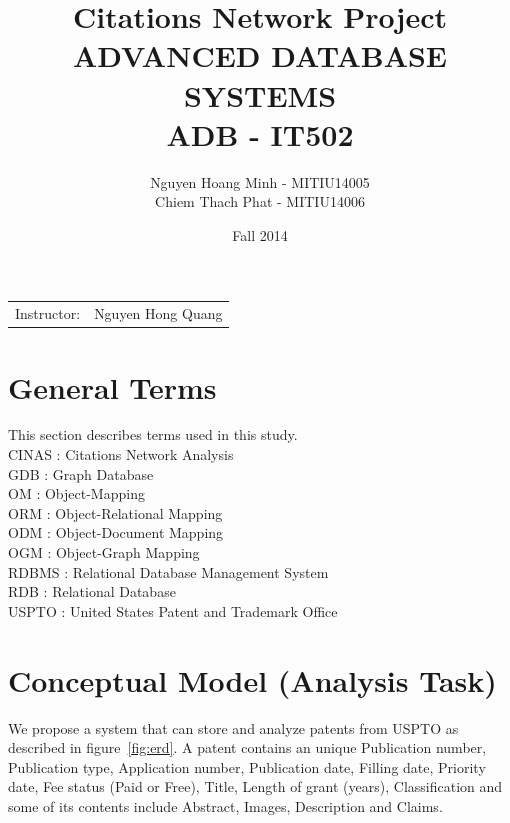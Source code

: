 \documentclass{article}
\title{Citations Network Project\\ ADVANCED DATABASE SYSTEMS \\ADB - IT502} %
\author{Nguyen Hoang Minh - MITIU14005\\Chiem Thach Phat - MITIU14006} %
\date{Fall 2014} %
\begin{document}
\maketitle
\begin{center}
\begin{tabular}{l r}
Instructor: & Nguyen Hong Quang
\end{tabular}
\end{center}


\section{General Terms}

This section describes terms used in this study.\\
CINAS : Citations Network Analysis\\
GDB : Graph Database\\
OM : Object-Mapping \\
ORM : Object-Relational Mapping \\
ODM : Object-Document Mapping \\
OGM : Object-Graph Mapping \\
RDBMS : Relational Database Management System \\
RDB : Relational Database\\
USPTO : United States Patent and Trademark Office\\


\section{Conceptual Model (Analysis Task)}

We propose a system that can store and analyze patents from USPTO as described in figure~\ref{fig:erd}. A patent contains an unique Publication number, Publication type, Application number, Publication date, Filling date, Priority date, Fee status (Paid or Free), Title, Length of grant (years), Classification and some of its contents include Abstract, Images, Description and Claims. 
\end{document}
